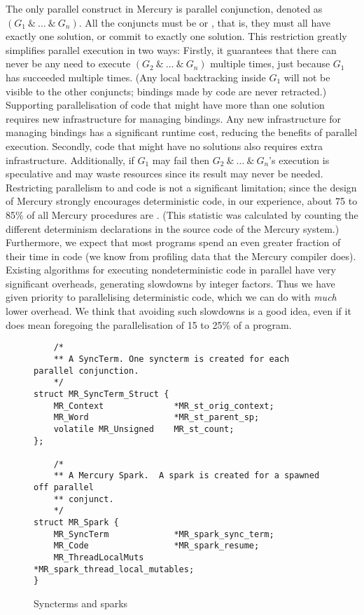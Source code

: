The only parallel construct in Mercury is parallel conjunction,
denoted as $(G_1~\&~\ldots~\&~G_n)$.
All the conjuncts must be \ddet or \dccmulti,
that is, they must all have exactly one solution,
or commit to exactly one solution.
This restriction greatly simplifies parallel execution in two ways:
Firstly,
it guarantees that there can never be any need
to execute $(G_2~\&~\ldots~\&~G_n)$ multiple times,
just because $G_1$ has succeeded multiple times.
(Any local backtracking inside $G_1$ will not be visible to the other
conjuncts;
bindings made by \ddet code are never retracted.)
Supporting parallelisation of
code that might have more than one solution
requires new infrastructure for managing bindings.
Any new infrastructure for managing bindings has a significant runtime cost,
reducing the benefits of parallel execution.
Secondly,
code that might have no solutions also requires extra infrastructure.
Additionally,
if $G_1$ may fail then
$G_2~\&~\ldots~\&~G_n$'s execution is speculative and may waste resources
since its result may never be needed.
Restricting parallelism to \ddet and \dccmulti code is not a significant
limitation;
since the design of Mercury strongly encourages deterministic code,
in our experience, about 75 to 85\% of all Mercury procedures are
\ddet.
(This statistic was calculated by counting the different
determinism declarations in the source code of the Mercury system.)
Furthermore,
we expect that most programs spend an even greater fraction of their time in
\ddet code
(we know from profiling data that the Mercury compiler does).
Existing algorithms for executing nondeterministic code in parallel
have very significant overheads, generating slowdowns by integer factors.
Thus we have given priority to parallelising deterministic code,
which we can do with \emph{much} lower overhead.
We think that avoiding such slowdowns is a good idea,
even if it does mean foregoing the parallelisation of 15 to 25\% of a program.

\begin{figure}
\begin{verbatim}
    /*
    ** A SyncTerm. One syncterm is created for each parallel conjunction.
    */
struct MR_SyncTerm_Struct {
    MR_Context              *MR_st_orig_context;
    MR_Word                 *MR_st_parent_sp;
    volatile MR_Unsigned    MR_st_count;
};

    /*
    ** A Mercury Spark.  A spark is created for a spawned off parallel
    ** conjunct.
    */
struct MR_Spark {
    MR_SyncTerm             *MR_spark_sync_term;
    MR_Code                 *MR_spark_resume;
    MR_ThreadLocalMuts      *MR_spark_thread_local_mutables;
}
\end{verbatim}
\caption{Syncterms and sparks}
\label{fig:spark_and_syncterm}
\end{figure}

